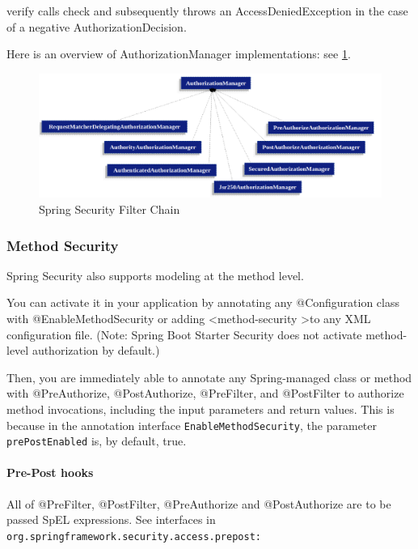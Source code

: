 \documentclass{scrartcl}
\begin{document}
verify calls check and subsequently throws an AccessDeniedException in the case of a negative AuthorizationDecision.

Here is an overview of AuthorizationManager implementations: see \ref{fig:auth-manag-impl}.

\begin{figure}
    \centering
    \includegraphics[width=1\linewidth]{auth-manag-impl}
    \caption{Spring Security Filter Chain}
    \label{fig:auth-manag-impl}
\end{figure}

\subsubsection{Method Security}

Spring Security also supports modeling at the method level.

You can activate it in your application by annotating any @Configuration class with @EnableMethodSecurity or adding \textless method-security \textgreater  to any XML configuration file. (Note: Spring Boot Starter Security does not activate method-level authorization by default.)

Then, you are immediately able to annotate any Spring-managed class or method with @PreAuthorize, @PostAuthorize, @PreFilter, and @PostFilter to authorize method invocations, including the input parameters and return values. This is because in the annotation interface \lstinline|EnableMethodSecurity|, the parameter \lstinline|prePostEnabled| is, by default, true.

\paragraph{Pre-Post hooks}

All of @PreFilter, @PostFilter, @PreAuthorize and @PostAuthorize are to be passed SpEL expressions. See interfaces in \lstinline|org.springframework.security.access.prepost:|
\end{document}
